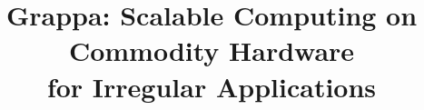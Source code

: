 
\usepackage{microtype}


\title{Grappa: Scalable Computing on Commodity Hardware \\for Irregular Applications}

\maketitle
\begin{abstract}

\end{abstract}



















%






